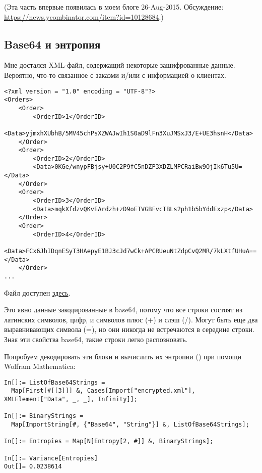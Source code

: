 \label{encrypted_DB1}

(Эта часть впервые появилась в моем блоге 26-Aug-2015.
Обсуждение: \url{https://news.ycombinator.com/item?id=10128684}.)

\subsection{Base64 и энтропия}

Мне достался \ac{XML}-файл, содержащий некоторые зашифрованные данные.
Вероятно, что-то связанное с заказми и/или с информацией о клиентах.

\begin{lstlisting}
<?xml version = "1.0" encoding = "UTF-8"?>
<Orders>
	<Order>
		<OrderID>1</OrderID>
		<Data>yjmxhXUbhB/5MV45chPsXZWAJwIh1S0aD9lFn3XuJMSxJ3/E+UE3hsnH</Data>
	</Order>
	<Order>
		<OrderID>2</OrderID>
		<Data>0KGe/wnypFBjsy+U0C2P9fC5nDZP3XDZLMPCRaiBw9OjIk6Tu5U=</Data>
	</Order>
	<Order>
		<OrderID>3</OrderID>
		<Data>mqkXfdzvQKvEArdzh+zD9oETVGBFvcTBLs2ph1b5bYddExzp</Data>
	</Order>
	<Order>
		<OrderID>4</OrderID>
		<Data>FCx6JhIDqnESyT3HAepyE1BJ3cJd7wCk+APCRUeuNtZdpCvQ2MR/7kLXtfUHuA==</Data>
	</Order>
...
\end{lstlisting}

Файл доступен \href{https://raw.githubusercontent.com/DennisYurichev/RE-for-beginners/master/examples/encrypted_DB1/encrypted.xml}{здесь}.

Это явно данные закодированные в base64, потому что все строки состоят из латинских символов, цифр,
и символов плюс (+) и слэш (/).
Могут быть еще два выравнивающих символа (=), но они никогда не встречаются в середине строки.
Зная эти свойства base64, такие строки легко распозновать.

Попробуем декодировать эти блоки и вычислить их энтропии () при помощи Wolfram Mathematica:

\begin{lstlisting}
In[]:= ListOfBase64Strings =
  Map[First[#[[3]]] &, Cases[Import["encrypted.xml"], XMLElement["Data", _, _], Infinity]];

In[]:= BinaryStrings =
  Map[ImportString[#, {"Base64", "String"}] &, ListOfBase64Strings];

In[]:= Entropies = Map[N[Entropy[2, #]] &, BinaryStrings];

In[]:= Variance[Entropies]
Out[]= 0.0238614
\end{lstlisting}

